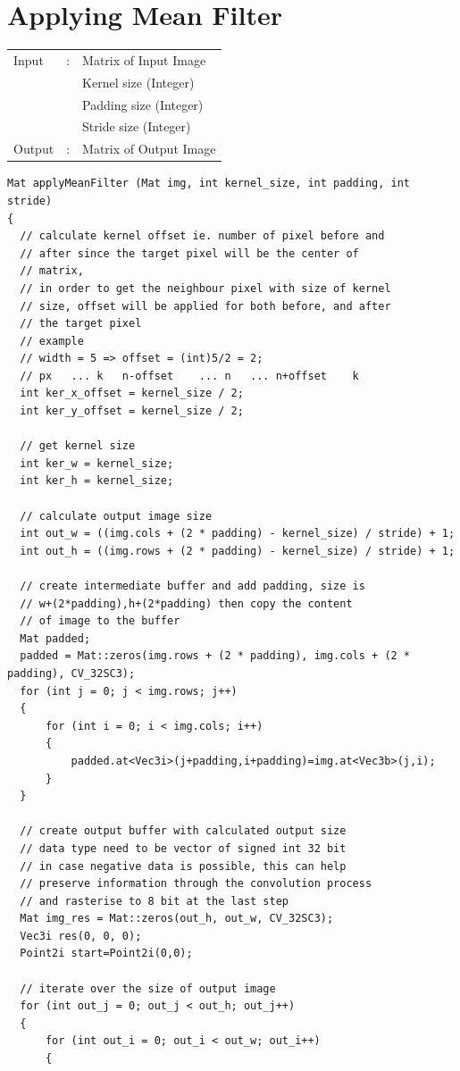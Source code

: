 \documentclass[12pt,a4paper]{report}
\begin{document}
\section{Applying Mean Filter}
\begin{tabular}{lll}
  Input  & : & Matrix of Input Image  \\
         &   & Kernel size (Integer)  \\
         &   & Padding size (Integer)  \\
         &   & Stride size (Integer)  \\
  Output & : & Matrix of Output Image \\
\end{tabular}
\begin{lstlisting}
Mat applyMeanFilter (Mat img, int kernel_size, int padding, int stride)
{
  // calculate kernel offset ie. number of pixel before and 
  // after since the target pixel will be the center of 
  // matrix,
  // in order to get the neighbour pixel with size of kernel
  // size, offset will be applied for both before, and after
  // the target pixel
  // example
  // width = 5 => offset = (int)5/2 = 2;
  // px   ... k   n-offset    ... n   ... n+offset    k
  int ker_x_offset = kernel_size / 2;
  int ker_y_offset = kernel_size / 2;

  // get kernel size
  int ker_w = kernel_size;
  int ker_h = kernel_size;

  // calculate output image size
  int out_w = ((img.cols + (2 * padding) - kernel_size) / stride) + 1;
  int out_h = ((img.rows + (2 * padding) - kernel_size) / stride) + 1;

  // create intermediate buffer and add padding, size is 
  // w+(2*padding),h+(2*padding) then copy the content 
  // of image to the buffer
  Mat padded;
  padded = Mat::zeros(img.rows + (2 * padding), img.cols + (2 * padding), CV_32SC3);
  for (int j = 0; j < img.rows; j++)
  {
      for (int i = 0; i < img.cols; i++)
      {
          padded.at<Vec3i>(j+padding,i+padding)=img.at<Vec3b>(j,i);
      }
  }
  
  // create output buffer with calculated output size
  // data type need to be vector of signed int 32 bit
  // in case negative data is possible, this can help
  // preserve information through the convolution process
  // and rasterise to 8 bit at the last step
  Mat img_res = Mat::zeros(out_h, out_w, CV_32SC3);
  Vec3i res(0, 0, 0);
  Point2i start=Point2i(0,0);

  // iterate over the size of output image
  for (int out_j = 0; out_j < out_h; out_j++)
  {
      for (int out_i = 0; out_i < out_w; out_i++)
      {
          

\end{lstlisting}
\end{document}
